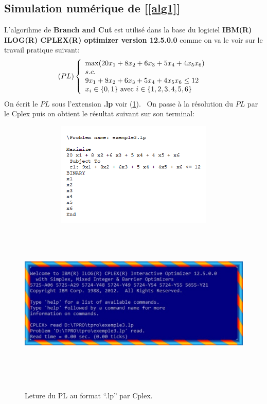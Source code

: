 \documentclass[a4paper,11pt,oneside]{report}
\theoremstyle{plain}
\newcommand{\0}{/ \! \! \! 0}
\theoremstyle{plain}
\begin{document}
\subsection*{Simulation num\'erique de [\ref{alg1}]}
L'algorihme de {\bf Branch and Cut} est utilis\'e dans la base du logiciel {\bf IBM(R) ILOG(R) CPLEX(R) optimizer version 12.5.0.0}
comme on va le voir sur le travail pratique suivant:
\[
(PL) \left\{\begin{array}{l}
         \max ( 20x_1 + 8x_2 + 6x_3 + 5x_4 + 4x_5 x_6)\\
         s.c.  \\
         9x_1 + 8x_2 + 6x_3 + 5x_4 + 4x_5 x_6 \leq 12\\
         x_i \in \{0,1\}\,\, \textnormal{avec} \,\, i\in \{1,2,3,4,5,6\}
        \end{array}
 \right.
\]
On \'ecrit le $PL$ sous l'extension {\bf .lp } voir (\ref{fig2}). \,
On passe \`a la r\'esolution du $PL$ par le Cplex puis on obtient le r\'esultat suivant sur son terminal:
  \begin{figure}[htbp]
  \begin{center}
  \includegraphics[height=5cm,width=12cm]{formalp.png}
  \includegraphics[height=8cm,width=16cm]{tp1.pdf}
  \caption{\label{fig2}Leture du PL au format ``.lp'' par Cplex.}
  \end{center}
  \end{figure}
\end{document}
